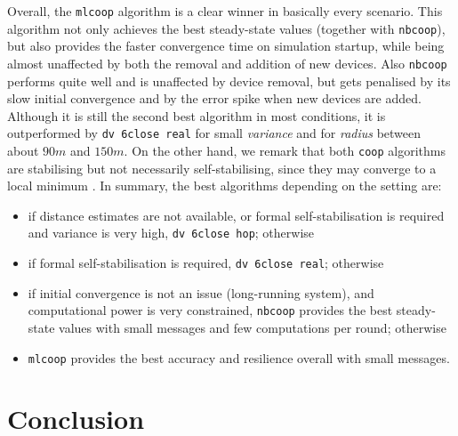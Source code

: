 \documentclass[runningheads]{llncs}
\begin{document}
Overall, the \texttt{mlcoop} algorithm is a clear winner in basically every scenario. This algorithm not only achieves the best steady-state values (together with \texttt{nbcoop}), but also provides the faster convergence time on simulation startup, while being almost unaffected by both the removal and addition of new devices. Also \texttt{nbcoop} performs quite well and is unaffected by device removal, but gets penalised by its slow initial convergence and by the error spike when new devices are added. Although it is still the second best algorithm in most conditions, it is outperformed by \texttt{dv 6close real} for small \emph{variance} and for \emph{radius} between about $90m$ and $150m$. On the other hand, we remark that both \texttt{coop} algorithms are stabilising but not necessarily self-stabilising, since they may converge to a local minimum \cite{11205997}. In summary, the best algorithms depending on the setting are:
\begin{itemize}
    \item if distance estimates are not available, or formal self-stabilisation is required and variance is very high, \texttt{dv 6close hop}; otherwise
    \item if formal self-stabilisation is required, \texttt{dv 6close real}; otherwise
    \item if initial convergence is not an issue (long-running system), and computational power is very constrained, \texttt{nbcoop} provides the best steady-state values with small messages and few computations per round; otherwise
    \item \texttt{mlcoop} provides the best accuracy and resilience overall with small messages.
\end{itemize}

\section{Conclusion} \label{sec:conclusion}
\end{document}
